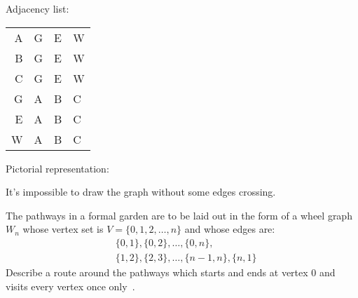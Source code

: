 \documentclass[a4paper, 12pt]{exam}
\begin{document}
\begin{questions}
\begin{solution}
		Adjacency list:
		
    \newpage
    \begin{center}
  		\begin{tabular}{r|lll}
  			A & G & E & W \\
  			B & G & E & W \\
  			C & G & E & W \\
  			G & A & B & C \\
  			E & A & B & C \\
  			W & A & B & C
  		\end{tabular}
		\end{center}
		
		Pictorial representation:
		\begin{center}
  	 \begin{adjustbox}{max width=0.6\textwidth}
			\end{adjustbox}
		\end{center}
		It's impossible to draw the graph without some edges crossing.
	\end{solution}
	


\question
  The pathways in a formal garden are to be laid out in the form of a wheel graph $W_n$ whose vertex set is $V = \{0,1,2,\ldots,n\}$ and whose edges are:
  \begin{align*}
  	&\{0,1\}, \{0,2\}, \ldots, \{0,n\}, \\
  	&\{1,2\}, \{2,3\}, \ldots, \{n-1,n\}, \{n,1\}
  \end{align*}
  Describe a route around the pathways which starts and ends at vertex 0 and visits every vertex once only~\cite{biggs02}.


\end{questions}
\end{document}
